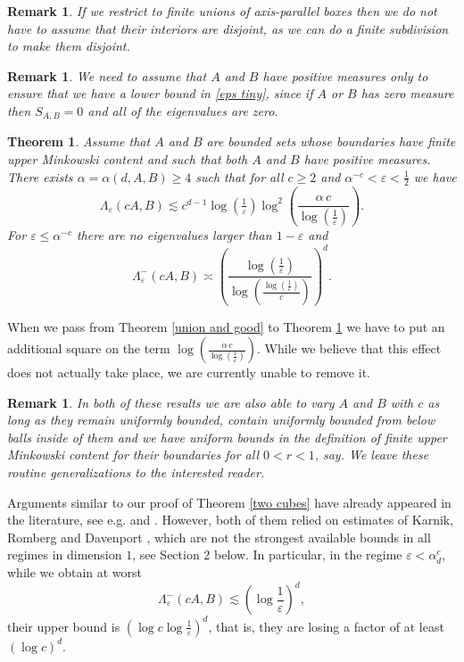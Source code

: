 \documentclass[12pt]{amsart}
\numberwithin{equation}{section}
\newcommand{\eps}{\varepsilon}
\newtheorem{theorem}[Thm]{Theorem}
\newtheorem{remark}[Thm]{Remark}
\begin{document}
\begin{remark}
If we restrict to finite unions of axis-parallel boxes then we do not have to assume that their interiors are disjoint, as we can do a finite subdivision to make them disjoint. 
\end{remark}
\begin{remark}
 We need to assume that $A$ and $B$ have positive measures only to ensure that we have a lower bound in \eqref{eps tiny}, since if $A$ or $B$ has zero measure then $S_{A,B} = 0$ and all of the eigenvalues are zero.   
\end{remark}

\begin{theorem}\label{good and good}
Assume that $A$ and $B$ are bounded sets whose boundaries have finite upper Minkowski content and such that both $A$ and $B$ have positive measures. There exists $\alpha =\alpha(d,A,B)\ge 4$ such that for all $c \ge 2$ and  $\alpha^{-c} < \eps < \frac{1}{2}$ we have
$$\Lambda_\eps(cA, B) \lesssim c^{d-1} \log(\tfrac{1}{\eps}) \log^2\left(\frac{\alpha \, c}{\log\left(\tfrac{1}{\eps}\right)}\right).$$
For $\eps \le \alpha^{-c}$ there are no eigenvalues larger than $1-\eps$ and
$$\Lambda^{-}_\eps(cA, B)\asymp \left( \frac{\log(\tfrac{1}{\eps})}{\log \left(\tfrac{\log\left(\frac{1}{\eps}\right)}{c}\right)}\right)^d.$$
\end{theorem}

When we pass from Theorem \ref{union and good} to Theorem \ref{good and good} we have to  put an additional square on the term $\log\left(\frac{\alpha \, c}{\log\left(\tfrac{1}{\eps}\right)}\right)$. While we believe that this effect does not actually take place, we are currently unable to remove it.
\begin{remark}
In both of these results we are also able to vary $A$ and $B$ with $c$ as long as they remain uniformly bounded, contain uniformly bounded from below balls inside of them and we have uniform bounds in the definition of finite upper Minkowski content for their boundaries for all $0 < r < 1$, say. We leave these routine generalizations to the interested reader.
\end{remark}
Arguments similar to our proof of Theorem \ref{two cubes} have already appeared in the literature, see e.g. \cite{bad_combinatorics} and \cite{Israel1}. However, both of them relied on estimates of Karnik, Romberg and Davenport \cite{Karnik_Romberg_Davenport}, which are not the strongest available bounds in all regimes in dimension $1$, see Section 2 below. In particular, in the regime $\eps < \alpha_d^c$, while we obtain at worst 
$$\Lambda_\eps^-(cA, B) \lesssim \left(\log\frac{1}{\eps}\right)^d,$$
their upper bound is $\left(\log c \log\frac{1}{\eps}\right)^d$, that is, they are losing a factor of at least $(\log c)^d$. 
\end{document}
